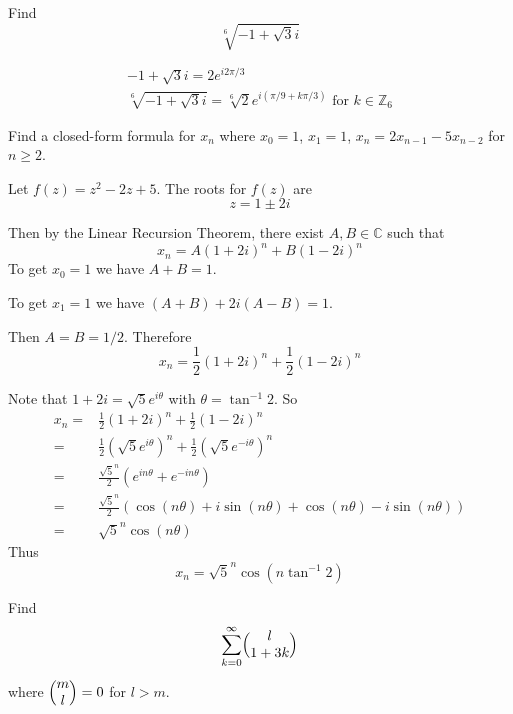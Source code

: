 \begin{exmp}
Find \[\sqrt[6]{-1 + \sqrt{3}i}\]
\end{exmp}

\begin{solution}
\begin{gather*}
    -1 + \sqrt{3} i = 2 e^{i 2\pi /3}\\
    \sqrt[6]{-1 + \sqrt{3}i} = \sqrt[6]{2}e^{i(\pi/9 + k\pi / 3)} \text{ for } k \in \mathbb{Z}_6
\end{gather*}
\end{solution}

\begin{exmp}[Application]
Find a closed-form formula for $x_n$ where $x_0 = 1$, $x_1 = 1$, $x_n = 2x_{n-1} - 5x_{n-2}$ for $n\geq 2$.
\end{exmp}

\begin{solution}
Let $f(z) = z^2 -2z + 5$. The roots for $f(z)$ are \[z = 1 \pm 2 i\]

Then by the Linear Recursion Theorem, there exist $A,B \in \mathbb{C}$ such that 
\[x_n = A(1+2i)^n + B(1-2i)^n\]
To get $x_0 = 1$ we have $A+B = 1$.

To get $x_1 = 1$ we have $(A+B) + 2i(A-B) = 1$.

Then $A = B = 1/2$. Therefore \[x_n = \frac{1}{2}(1+2i)^n + \frac{1}{2}(1-2i)^n\]

Note that $1 + 2i = \sqrt{5} e^{i \theta}$ with $\theta = \tan ^{-1} 2$. So 
\begin{align*}
    x_n = & \frac{1}{2}(1+2i)^n + \frac{1}{2}(1-2i)^n \\
    =& \frac{1}{2}(\sqrt{5} e^{i \theta})^n + \frac{1}{2}(\sqrt{5} e^{-i \theta})^n \\
    = & \frac{\sqrt{5}^n}{2} (e^{in\theta} + e^{-in\theta})\\
    = & \frac{\sqrt{5}^n}{2} (\cos (n\theta) + i\sin (n\theta ) + \cos (n\theta) - i\sin (n\theta ))\\
    = & \sqrt{5}^n \cos (n\theta )
\end{align*}
Thus \[x_n = \sqrt{5}^n \cos (n\tan^{-1} 2)\]
\end{solution}

\begin{exmp}
Find \[\sum_{k=0}^{\infty} \mybinom{l}{1+3k}\] where $\mybinom{m}{l} = 0$ for $l>m$.
\end{exmp}

